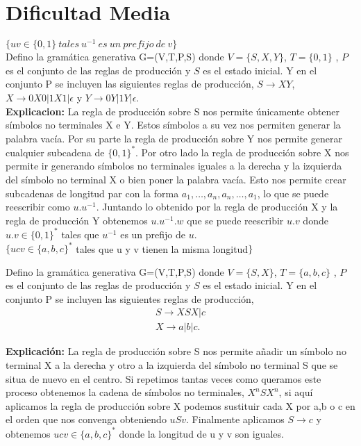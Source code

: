 \documentclass[a4paper,11pt]{article}
\begin{document}
\section{Dificultad Media}
$\{uv \in \{0,1\} \> tales \> u^{-1} \> es \> un \> prefijo \> de \> v\}$ \\


Defino la gramática generativa G=(V,T,P,S) donde $V=\{S,X,Y\}$, $T=\{0,1\}$ , $P$ es el conjunto de las reglas de producción y $S$ es el estado inicial. Y en el conjunto P se incluyen las siguientes reglas de producción, $S \rightarrow XY$, $X \rightarrow 0X0|1X1|\epsilon$ y $Y \rightarrow 0Y|1Y|\epsilon$. \\

\textbf{Explicacion:} La regla de producción sobre S nos permite únicamente obtener símbolos no terminales X e Y. Estos símbolos a su vez nos permiten generar la palabra vacía. Por su parte la regla de producción sobre Y nos permite generar cualquier subcadena de $\{0,1\}^*$. Por otro lado la regla de producción sobre X nos permite ir generando símbolos no terminales iguales a la derecha y la izquierda del símbolo no terminal X o bien poner la palabra vacía. Esto nos permite crear subcadenas de longitud par con la forma $a_1,\ldots,a_n,a_n,\ldots,a_1$, lo que se puede reescribir como $u.u^{-1}$. Juntando lo obtenido por la regla de producción X y la regla de producción Y obtenemos $u.u^{-1}.w$ que se puede reescribir $u.v$ donde $u.v \in \{0,1 \}^*$ tales que $u^{-1}$ es un prefijo de $u$. \\

$\{ucv \in \{a,b,c\}^*$ tales que u y v tienen la misma longitud$\}$

Defino la gramática generativa G=(V,T,P,S) donde $V=\{S,X\}$, $T=\{a,b,c\}$ , $P$ es el conjunto de las reglas de producción y $S$ es el estado inicial. Y en el conjunto P se incluyen las siguientes reglas de producción, 
\begin{align*}
S \rightarrow XSX|c  \\ 
X \rightarrow a|b|c. 
\end{align*}


\textbf{Explicación:} La regla de producción sobre S nos permite añadir un símbolo no terminal X a la derecha y otro a la izquierda del símbolo no terminal S que se situa de nuevo en el centro. Si repetimos tantas veces como queramos este proceso obtenemos la cadena de símbolos no terminales, $X^nSX^n$, si aquí aplicamos la regla de producción sobre X podemos sustituir cada X por a,b o c en el orden que nos convenga obteniendo $uSv$. Finalmente aplicamos $S \rightarrow c$ y obtenemos $ucv \in \{a,b,c\}^*$ donde la longitud de u y v son iguales. \\
\end{document}
